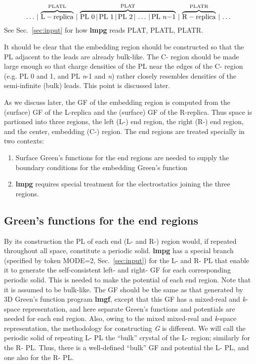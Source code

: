 \documentclass{article}
\begin{document}
\[
  \ldots \,|\,
 \overbrace{\rm L-replica}^{\rm PLATL}\,|\,
 \overbrace{{\rm PL}\ 0 \,|\, {\rm PL}\ 1 \,|\, {\rm PL}\ 2 \,|\,  \ldots \,|\, {\rm PL}\ n{\rm{-}}1}^{\rm PLAT}\,|\,
 \overbrace{\rm R-replica}^{\rm PLATR}\,|\, \ldots
\]
See Sec.~\ref{sec:input} for how {\bf lmpg} reads PLAT, PLATL, PLATR.

It should be clear that the embedding region should be
constructed so that the PL adjacent to the leads are already
bulk-like.  The C- region should be made large enough so that
charge densities of the PL near the edges of the C- region
(e.g. PL 0 and 1, and PL {\em n}-1 and {\em n}) rather closely
resembles densities of the semi-infinite (bulk) leads.  This
point is discussed later.

As we discuss later, the GF of the embedding region is computed
from the (surface) GF of the L-replica and the (surface) GF of
the R-replica.  Thus space is partioned into three regions, the
left (L-) end region, the right (R-) end region, and the center,
embedding (C-) region.
The end regions are treated specially in two contexts:
\begin{enumerate}

  \item Surface Green's functions for the end regions are needed
to supply the boundary conditions for the embedding Green's
function

  \item {\bf lmpg} requires special treatment for the electrostatics joining
the three regions.

\end{enumerate}

\subsection{Green's functions for the end regions}
\label{sec:GFends}

By its construction the PL of each end (L- and R-) region would,
if repeated throughout all space, constitute a periodic solid.
{\bf lmpg} has a special branch (specified by token MODE=2,
Sec.~\ref{sec:input}) for the L- and R- PL that enable it to
generate the self-consistent left- and right- GF for each
corresponding periodic solid.  This is needed to make the
potential of each end region.  Note that it is assumed to be
bulk-like.  The GF should be the same as that generated by 3D
Green's function program {\bf lmgf}, except that this GF has a
mixed-real and {\em k}-space representation, and here separate
Green's functions and potentials are needed for each end region.
Also, owing to the mixed mixed-real and {\em k}-space
representation, the methodology for constructing {\em G} is
different.  We will call the periodic solid of repeating L- PL
the ``bulk'' crystal of the L- region; similarly for the R- PL.
Thus, there is a well-defined ``bulk'' GF and potential the L-
PL, and one also for the R- PL.
\end{document}
